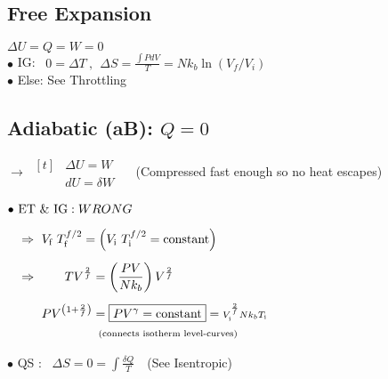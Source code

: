 \documentclass[12pt]{article}
\begin{document}
\begin{minipage}[t]{.52\textwidth}
    \subsection{Free Expansion}
    \(\boxed{ \Delta U = Q = W = 0 }\)\\[5pt]
    \(\bullet\) IG: \ \(\boxed{ 0 = \Delta T } \ , \ \ 
        \boxed{ \Delta S = \tfrac{{\scriptstyle \int} P dV}{T} = N k_b \ln (V_f / V_i) }\)\\[5pt]
    \(\bullet\) Else: See Throttling

    \subsection{Adiabatic (aB): \(\boxed{ Q=0 }\)}
    
    \(\rightarrow\ \begin{aligned}[t]
            &\Delta U = W\\
            &\boxed{ dU = \delta W }
        \end{aligned}\) \ \ {\scriptsize(Compressed fast enough so no heat escapes)}

    \vspace{10pt}
    \(\bullet\ \begin{aligned}[t]
            &\text{ET \& IG}: WRONG%
                \\[5pt]
            &\Rightarrow\ V_\text{f}\ T_\text{f}^{f/2} 
                = \left( V_\text{i}\ T_\text{i}^{f/2} = \text{constant} \right)\\[5pt]
            &\Rightarrow\ \begin{aligned}[t]
                    T V^{\frac{2}{f}} &= \left( \frac{PV}{Nk_b} \right) V^{\frac{2}{f}}\\[5pt]
                    PV^{\left( 1+\frac{2}{f} \right)} &= \boxed{ PV^{\gamma} = \text{constant} }
                        = {\scriptstyle V_\text{i}^{\frac{2}{f}} N k_b T_\text{i}}\\
                    &\hspace{5pt} \text{\scriptsize(connects isotherm level-curves)}
                \end{aligned}
        \end{aligned}\)    

    \vspace{5pt}
    \(\bullet\) QS : \ \(\boxed{ \Delta S = 0  = \int \frac{\delta Q}{T} }\)\ \ {\scriptsize(See Isentropic)}
\end{minipage}
\end{document}
